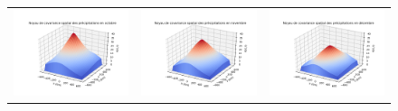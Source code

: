 \documentclass[a4paper,11pt]{article}
\numberwithin{equation}{section}
\begin{document}
\begin{figure}[H]
\hspace{-1.3cm}
\begin{tabular}{ccc}
	\includegraphics[scale=0.34]{images/kernel_precip_m10.png} & \includegraphics[scale=0.34]{images/kernel_precip_m11.png} & \includegraphics[scale=0.34]{images/kernel_precip_m12.png} \\

\end{tabular}
\end{figure}
\end{document}
